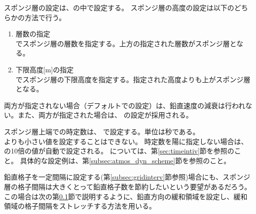 スポンジ層の設定は、の中で設定する。
スポンジ層の高度の設定は以下のどちらかの方法で行う。
\begin{enumerate}
\item 層数の指定\\
   でスポンジ層の層数を指定する。上方の指定された層数がスポンジ層となる。
\item 下限高度[m]の指定\\
   でスポンジ層の下限高度を指定する。指定された高度よりも上がスポンジ層となる。
\end{enumerate}
両方が指定されない場合（デフォルトでの設定）は、鉛直速度の減衰は行われない。また、両方が指定された場合は、 の設定が採用される。

スポンジ層上端での時定数は、 で設定する。単位は秒である。\\
よりも小さい値を設定することはできない。
時定数を陽に指定しない場合は、 の10倍の値が自動で設定される。
については、第\ref{sec:timeintiv}節を参照のこと。
具体的な設定例は、第\ref{subsec:atmos_dyn_scheme}節を参照のこと。

鉛直格子を一定間隔に設定する(第\ref{subsec:gridinterv}節参照)場合にも、スポンジ層の格子間隔は大きくとって鉛直格子数を節約したいという要望があるだろう。
この場合は次の第\ref{subsec:buffer}節で説明するように、鉛直方向の緩和領域を設定し、緩和領域の格子間隔をストレッチする方法を用いる。


\subsection{\SubsecBasicBufferSetting} \label{subsec:buffer}

